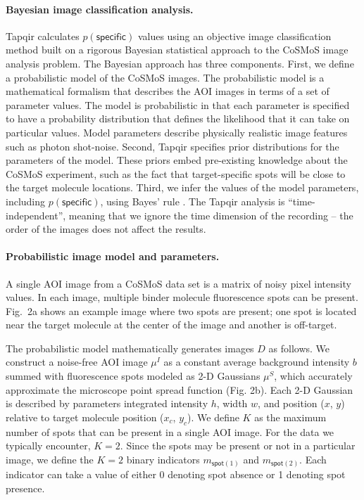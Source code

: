 \paragraph{Bayesian image classification analysis.}
Tapqir calculates $p(\mathsf{specific})$ values using an objective image classification method built on a rigorous Bayesian statistical approach to the CoSMoS image analysis problem. The Bayesian approach has three components. First, we define a probabilistic model of the CoSMoS images. The probabilistic model is a mathematical formalism that describes the AOI images in terms of a set of parameter values.  The model is probabilistic in that each parameter is specified to have a probability distribution that defines the likelihood that it can take on particular values. Model parameters describe physically realistic image features such as photon shot-noise. Second, Tapqir specifies prior distributions for the parameters of the model. These priors embed pre-existing knowledge about the CoSMoS experiment, such as the fact that target-specific spots will be close to the target molecule locations. Third, we infer the values of the model parameters, including $p(\mathsf{specific})$, using Bayes' rule \cite{Bishop2006-oa}. The Tapqir analysis is “time-independent”, meaning that we ignore the time dimension of the recording -- the order of the images does not affect the results.


\paragraph{Probabilistic image model and parameters.} %
A single AOI image from a CoSMoS data set is a matrix of noisy pixel intensity values.  In each image, multiple binder molecule fluorescence spots can be present. Fig.~2a shows an example image where two spots are present; one spot is located near the target molecule at the center of the image and another is off-target. 

The probabilistic model mathematically generates images $D$ as follows.  We construct a noise-free AOI image $\mu^I$ as a constant average background intensity $b$ summed with fluorescence spots modeled as 2-D Gaussians $\mu^S$, which accurately approximate the microscope point spread function \cite{Zhang2007-rb} (Fig. 2b). Each 2-D Gaussian is described by parameters integrated intensity $h$, width $w$, and position ($x$, $y$) relative to target molecule position ($x_c$, $y_c$). We define $K$ as the maximum number of spots that can be present in a single AOI image.  For the data we typically encounter, $K = 2$. Since the spots may be present or not in a particular image, we define the $K = 2$ binary indicators $m_{\mathsf{spot}(1)}$ and $m_{\mathsf{spot}(2)}$.  Each indicator can take a value of either 0 denoting spot absence or 1 denoting spot presence. 

